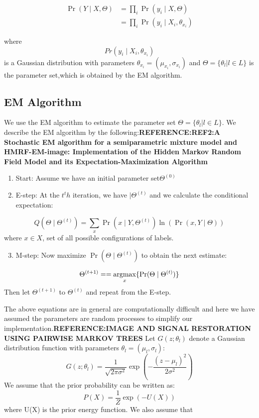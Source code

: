 \begin{equation}\label{eq1}
\begin{split}
\Pr( Y \mid X,\Theta) & =\prod_{i}^{ }\Pr( y_i \mid X,\Theta)\\
& =\prod_{i}^{ }\Pr( y_i \mid X_i,\theta_{x_i})
\end{split}
\end{equation}

where \[Pr( y_i \mid X_i,\theta_{x_i})\] is a Gaussian distribution with parameters
\(\theta_{x_i}=(\mu_{x_i} , \sigma_{x_i})\) and \(\Theta=\{\theta_l\lvert l \in L\}\)
is the parameter set,which is obtained by the EM algorithm.

\subsection{EM Algorithm}
We use the EM algorithm to estimate the parameter set \(\Theta=\{\theta_l\lvert l \in L\}\). We describe the EM algorithm by the following:\textbf{REFERENCE:REF2:A Stochastic EM algorithm for a semiparametric mixture model and HMRF-EM-image: Implementation of the Hidden Markov Random Field Model and its Expectation-Maximization Algorithm}
\begin{enumerate}
	\item Start: Assume we have an initial parameter set\(\Theta^{(0)}\)
	\item  E-step: At the \(t^th\) iteration, we have  \(|\Theta^{(t)}\) and we calculate the conditional expectation:
\end{enumerate}
\begin{equation}
Q(\Theta \mid \Theta^{(t)}) = {\sum\limits_{x} }\Pr( x \mid Y,\Theta^{(t)})\ln (\Pr( x,Y \mid \Theta))
\end{equation}
where $ x \in X$, set of all possible configurations of labels.

\begin{enumerate}
	\setcounter{enumi}{2}
	\item M-step: Now maximize \(\Pr(\Theta \mid \Theta^{(t)})\) to obtain the next
	estimate:
\end{enumerate}
\begin{equation}
\Theta^{(t+1)}==\operatorname*{argmax}_x\{\Pr(\Theta \mid \Theta^{(t)})\} 
\end{equation}
Then let \(\Theta^{(t+1)}\) to \(\Theta^{(t)}\) and repeat from the E-step.

The above equations are in general are computationally difficult and here we have assumed the parameters are random processes to simplify our implementation.\textbf{REFERENCE:IMAGE AND SIGNAL RESTORATION USING PAIRWISE MARKOV TREES}   Let \(G(z;\theta_l)\) denote a Gaussian distribution function with parameters \(\theta_l=(\mu_l,\sigma_l)\):
\begin{equation}
G(z;\theta_l)= \frac{1}{\sqrt{2\pi\sigma^2}}\exp(-\frac{(z-\mu_l)^2}{2\sigma^2})   
\end{equation}
We assume that the prior probability can be written as:
\begin{equation}
P(X)=\frac{1}{Z}\exp{(-U(X))}  
\end{equation}
where U(X) is the prior energy function. We also assume that


